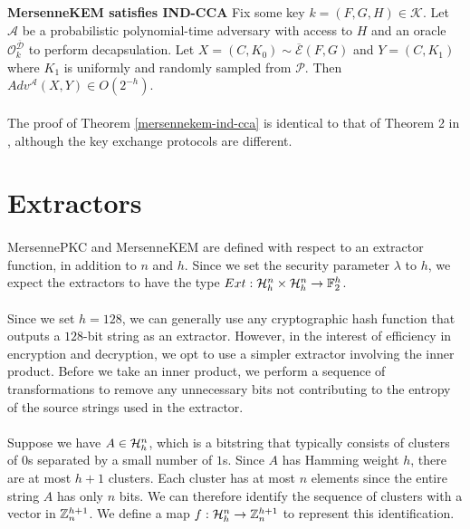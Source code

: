\begin{theorem}{\textbf{MersenneKEM satisfies IND-CCA}}\label{mersennekem-ind-cca}
Fix some key $k = (F, G, H) \in \mathcal{K}$. Let $\mathcal{A}$ be a probabilistic polynomial-time adversary with access to $H$ and an oracle $\mathcal{O}_k^{\overline{\mathcal{D}}}$ to perform decapsulation. Let $X = (C, K_0) \sim \overline{\mathcal{E}}(F, G)$ and $Y = (C, K_1)$ where $K_1$ is uniformly and randomly sampled from $\mathcal{P}$. Then $Adv^\mathcal{A}(X, Y) \in O(2^{-h})$.
\end{theorem}

\paragraph{}
The proof of Theorem \ref{mersennekem-ind-cca} is identical to that of Theorem 2 in \cite{aggarwal2018new}, although the key exchange protocols are different.

\section{Extractors}
\paragraph{}
MersennePKC and MersenneKEM are defined with respect to an extractor function, in addition to $n$ and $h$. Since we set the security parameter $\lambda$ to $h$, we expect the extractors to have the type $Ext: \mathcal{H}_h^n \times \mathcal{H}_h^n \rightarrow \mathbb{F}_2^h$.

\paragraph{}
Since we set $h = 128$, we can generally use any cryptographic hash function that outputs a $128$-bit string as an extractor. However, in the interest of efficiency in encryption and decryption, we opt to use a simpler extractor involving the inner product. Before we take an inner product, we perform a sequence of transformations to remove any unnecessary bits not contributing to the entropy of the source strings used in the extractor.

\paragraph{}
Suppose we have $A \in \mathcal{H}_h^n$, which is a bitstring that typically consists of clusters of $0$s separated by a small number of $1$s. Since $A$ has Hamming weight $h$, there are at most $h+1$ clusters. Each cluster has at most $n$ elements since the entire string $A$ has only $n$ bits. We can therefore identify the sequence of clusters with a vector in $\mathbb{Z}_n^{h+1}$. We define a map $f: \mathcal{H}_h^n \rightarrow \mathbb{Z}_n^{h+1}$ to represent this identification.

